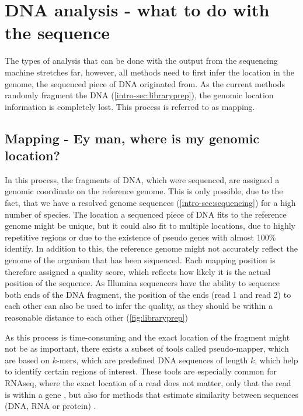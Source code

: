\section[DNA analysis]{DNA analysis - what to do with the sequence}
\label{intro-sec:analysis}
The types of analysis that can be done with the output from the sequencing machine stretches far,  however, all methods need to first infer the location in the genome, the sequenced piece of DNA originated from. As the current methods randomly fragment the DNA (\autoref{intro-sec:libraryprep}), the genomic location information is completely lost. This process is referred to as mapping.

\subsection[Mapping]{Mapping - Ey man, where is my genomic location?}
\label{intro-sec:mapping}
In this process, the fragments of DNA, which were sequenced, are assigned a genomic coordinate on the reference genome. This is only possible, due to the fact, that we have a resolved genome sequences (\autoref{intro-sec:sequencing}) for a high number of species. The location a sequenced piece of DNA fits to the reference genome might be unique, but it could also fit to multiple locations, due to highly repetitive regions or due to the existence of pseudo genes with almost 100\% identify. In addition to this, the reference genome might not accurately reflect the genome of the organism that has been sequenced. Each mapping position is therefore assigned a quality score, which reflects how likely it is the actual position of the sequence. As Illumina sequencers have the ability to sequence both ends of the DNA fragment, the position of the ends (read 1 and read 2) to each other can also be used to infer the quality, as they should be within a reasonable distance to each other (\autoref{fig:libraryprep})

As this process is time-consuming and the exact location of the fragment might not be as important, there exists a subset of tools called pseudo-mapper, which are based on $k$-mers, which are predefined DNA sequences of length $k$, which help to identify certain regions of interest. These tools are especially common for RNAseq, where the exact location of a read does not matter, only that the read is within a gene \cite{Bray2016,Patro2017}, but also for methods that estimate similarity between sequences (DNA, RNA or protein) \cite{Ondov2016,Luczak2017}.

